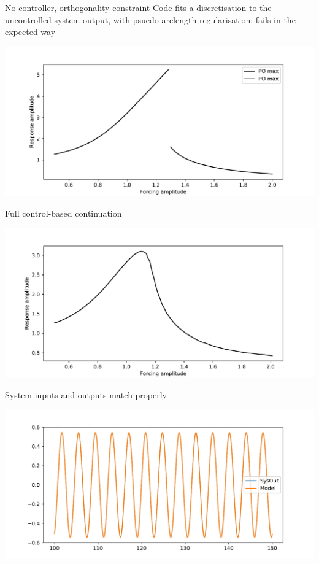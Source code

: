 \documentclass[presentation]{beamer}
\begin{document}
\begin{frame}[label={sec:orgda4cf77}]{No controller, orthogonality constraint}
Code fits a discretisation to the uncontrolled system output, with psuedo-arclength regularisation; fails in the expected way

\begin{center}
\includegraphics[width=.9\linewidth]{./controlfree_continuation.pdf}
\end{center}
\end{frame}

\begin{frame}[label={sec:orgf24aef9}]{Full control-based continuation}
\begin{center}
\includegraphics[width=.9\linewidth]{./failed_duffing.pdf}
\end{center}
\end{frame}

\begin{frame}[label={sec:org13035e4}]{System inputs and outputs match properly}
\begin{center}
\includegraphics[width=.9\linewidth]{./trial.pdf}
\end{center}
\end{frame}
\end{document}
